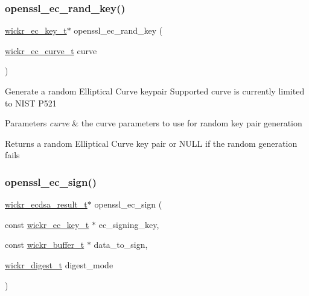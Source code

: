 \subsubsection{\texorpdfstring{openssl\+\_\+ec\+\_\+rand\+\_\+key()}{openssl\_ec\_rand\_key()}}
{\footnotesize\ttfamily \hyperlink{structwickr__ec__key}{wickr\+\_\+ec\+\_\+key\+\_\+t}$\ast$ openssl\+\_\+ec\+\_\+rand\+\_\+key (\begin{DoxyParamCaption}\item[{\hyperlink{structwickr__ec__curve}{wickr\+\_\+ec\+\_\+curve\+\_\+t}}]{curve }\end{DoxyParamCaption})}

Generate a random Elliptical Curve keypair Supported curve is currently limited to N\+I\+ST P521


\begin{DoxyParams}{Parameters}
{\em curve} & the curve parameters to use for random key pair generation \\
\hline
\end{DoxyParams}
\begin{DoxyReturn}{Returns}
a random Elliptical Curve key pair or N\+U\+LL if the random generation fails 
\end{DoxyReturn}
\mbox{\label{group__openssl__crypto_gab32cef5c789ee1992afae98a81b65823}} 
\subsubsection{\texorpdfstring{openssl\+\_\+ec\+\_\+sign()}{openssl\_ec\_sign()}}
{\footnotesize\ttfamily \hyperlink{structwickr__ecdsa__result}{wickr\+\_\+ecdsa\+\_\+result\+\_\+t}$\ast$ openssl\+\_\+ec\+\_\+sign (\begin{DoxyParamCaption}\item[{const \hyperlink{structwickr__ec__key}{wickr\+\_\+ec\+\_\+key\+\_\+t} $\ast$}]{ec\+\_\+signing\+\_\+key,  }\item[{const \hyperlink{structwickr__buffer}{wickr\+\_\+buffer\+\_\+t} $\ast$}]{data\+\_\+to\+\_\+sign,  }\item[{\hyperlink{structwickr__digest}{wickr\+\_\+digest\+\_\+t}}]{digest\+\_\+mode }\end{DoxyParamCaption})}

